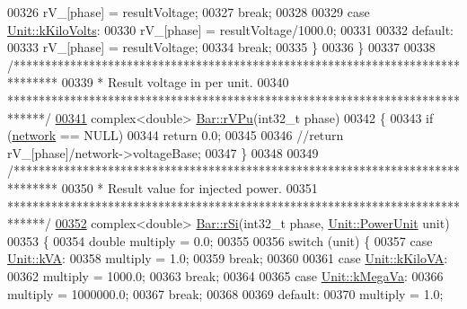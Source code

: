 \begin{DoxyCode}
00326     rV\_[phase] = resultVoltage;
00327     \textcolor{keywordflow}{break};
00328 
00329   \textcolor{keywordflow}{case} \hyperlink{class_unit_a55b07dfa9457e1eca2c7194fe0cfc3c1a35a201a658c2cd89766787c657e9a54d}{Unit::kKiloVolts}:
00330     rV\_[phase] = resultVoltage/1000.0;
00331 
00332   \textcolor{keywordflow}{default}:
00333     rV\_[phase] = resultVoltage;
00334     \textcolor{keywordflow}{break};
00335   \}
00336 \}
00337 
00338 \textcolor{comment}{/*******************************************************************************}
00339 \textcolor{comment}{ * Result voltage in per unit.}
00340 \textcolor{comment}{ ******************************************************************************/}
\hypertarget{bar_8cpp_source_l00341}{}\hyperlink{group___models_ga7deee8820e2ee3e0db993a1e76b68700}{00341} complex<double> \hyperlink{group___models_ga7deee8820e2ee3e0db993a1e76b68700}{Bar::rVPu}(int32\_t phase)
00342 \{
00343   \textcolor{keywordflow}{if} (\hyperlink{class_bar_a80025f13884750add58cc61b318357ff}{network} == NULL)
00344     \textcolor{keywordflow}{return} 0.0;
00345 
00346   \textcolor{comment}{//return rV\_[phase]/network->voltageBase;}
00347 \}
00348 
00349 \textcolor{comment}{/*******************************************************************************}
00350 \textcolor{comment}{ * Result value for injected power.}
00351 \textcolor{comment}{ ******************************************************************************/}
\hypertarget{bar_8cpp_source_l00352}{}\hyperlink{group___models_gac8ddd4cb566d995b70b0f83146aa12b3}{00352} complex<double> \hyperlink{group___models_gac8ddd4cb566d995b70b0f83146aa12b3}{Bar::rSi}(int32\_t phase, \hyperlink{class_unit_ace265ae255370ccacfd5370337572c3b}{Unit::PowerUnit} unit)
00353 \{
00354   \textcolor{keywordtype}{double} multiply = 0.0;
00355 
00356   \textcolor{keywordflow}{switch} (unit) \{
00357   \textcolor{keywordflow}{case} \hyperlink{class_unit_ace265ae255370ccacfd5370337572c3ba72b181a842ae2759488a2fa1410d3696}{Unit::kVA}:
00358     multiply = 1.0;
00359     \textcolor{keywordflow}{break};
00360 
00361   \textcolor{keywordflow}{case} \hyperlink{class_unit_ace265ae255370ccacfd5370337572c3bac9e5154522fbb810d7aed75c3ff47cb2}{Unit::kKiloVA}:
00362     multiply = 1000.0;
00363     \textcolor{keywordflow}{break};
00364 
00365   \textcolor{keywordflow}{case} \hyperlink{class_unit_ace265ae255370ccacfd5370337572c3ba6039da0ed20f8bee64305bab8bdec365}{Unit::kMegaVa}:
00366     multiply = 1000000.0;
00367     \textcolor{keywordflow}{break};
00368 
00369   \textcolor{keywordflow}{default}:
00370     multiply = 1.0;

\end{DoxyCode}
